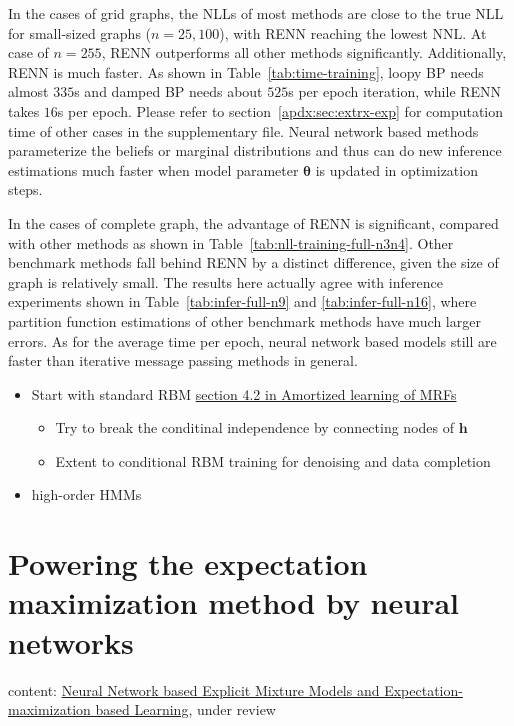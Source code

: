 In the cases of grid graphs, the NLLs of most methods are close to the true NLL for small-sized graphs ($n=25,100$), with RENN reaching the lowest NNL. At case of $n=255$, RENN outperforms all other methods significantly. Additionally, RENN is much faster. As shown in Table~\ref{tab:time-training}, loopy BP needs almost $335$s and damped BP needs about $525$s per epoch iteration, while RENN takes $16$s per epoch. Please refer to section~\ref{apdx:sec:extrx-exp} for computation time of other cases in the supplementary file.
Neural network based methods parameterize the beliefs or marginal distributions and thus can do new inference estimations much faster when model parameter $\bm{\theta}$ is updated in optimization steps. %



In the cases of complete graph, the advantage of RENN is significant, compared with other methods as shown in Table~\ref{tab:nll-training-full-n3n4}. Other benchmark methods fall behind RENN by a distinct difference, given the size of graph is relatively small. The results here actually agree with inference experiments shown in Table~\ref{tab:infer-full-n9} and \ref{tab:infer-full-n16}, where partition function estimations of other benchmark methods have much larger errors. As for the average time per epoch, neural network based models still are faster than iterative message passing methods in general.



\begin{itemize}
\item Start with standard RBM \href{https://papers.nips.cc/paper/9687-amortized-bethe-free-energy-minimization-for-learning-mrfs.pdf}{section 4.2 in Amortized learning of MRFs}
  \begin{itemize}
  \item Try to break the conditinal independence by connecting nodes of $\bm{h}$
  \item Extent to conditional RBM training for denoising and data completion
  \end{itemize}
\item high-order HMMs

\end{itemize}




\chapter{Powering the expectation maximization method by neural networks}
content: \href{https://arxiv.org/abs/1907.13432}{Neural Network based Explicit Mixture Models and Expectation-maximization based Learning}, under review

